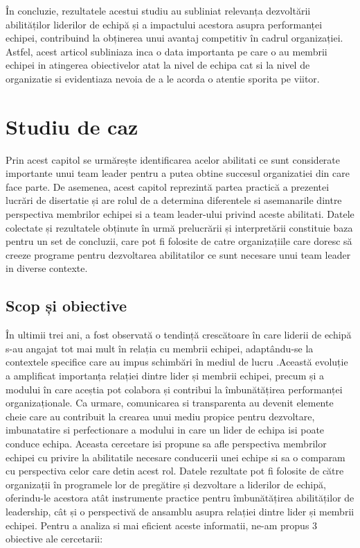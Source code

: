 \documentclass[a4paper, 12pt]{article}
\begin{document}
\begin{itemize}
	\quad În concluzie, rezultatele acestui studiu au subliniat relevanța dezvoltării abilităților liderilor de echipă și a impactului acestora asupra performanței echipei, contribuind la obținerea unui avantaj competitiv în cadrul organizației. Astfel, acest articol subliniaza inca o data importanta pe care o au membrii echipei in atingerea obiectivelor atat la nivel de echipa cat si la nivel de organizatie si evidentiaza nevoia de a le acorda o atentie sporita pe viitor.


\newpage
\end{itemize}

\setcounter{section}{2}
	\section{Studiu de caz }

	\quad\quad Prin acest capitol se urmărește identificarea acelor abilitati ce sunt  considerate importante unui team leader pentru a putea obtine succesul organizatiei din care face parte. De asemenea, acest capitol reprezintă partea practică a prezentei lucrări de disertatie și are rolul de a determina diferentele si asemanarile dintre perspectiva membrilor echipei si a team leader-ului privind  aceste abilitati. Datele colectate și rezultatele obținute în urmă prelucrării și interpretării constituie baza pentru un set de concluzii, care pot fi folosite de catre organizațiile care doresc să creeze programe pentru dezvoltarea abilitatilor ce sunt necesare unui team leader in diverse contexte.

	\subsection{Scop și obiective}
	
	\quad În ultimii trei ani, a fost observată o tendință crescătoare în care liderii de echipă s-au angajat tot mai mult în relația cu membrii echipei, adaptându-se la contextele specifice care au impus schimbări în mediul de lucru .Această evoluție a amplificat importanța relației dintre lider și membrii echipei, precum și a modului în care aceștia pot colabora și contribui la îmbunătățirea performanței organizaționale. Ca urmare, comunicarea si transparenta au devenit elemente cheie care au contribuit la crearea unui mediu propice pentru dezvoltare, imbunatatire si perfectionare a modului in care un lider de echipa isi poate conduce echipa. Aceasta cercetare isi propune sa afle perspectiva membrilor echipei cu privire la abilitatile necesare conducerii unei echipe si sa o comparam cu perspectiva celor care detin acest rol. Datele rezultate  pot fi folosite de către organizații în programele lor de pregătire și dezvoltare a liderilor de echipă, oferindu-le acestora atât instrumente practice pentru îmbunătățirea abilităților de leadership, cât și o perspectivă de ansamblu asupra relației dintre lider și membrii echipei. Pentru a analiza si mai eficient aceste informatii, ne-am propus 3 obiective ale cercetarii: 
\end{document}
